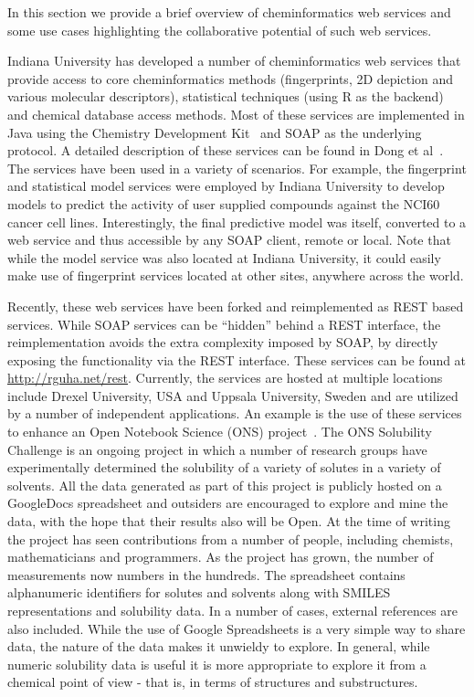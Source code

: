 \documentclass[11pt]{book}
\begin{document}
In this section we provide a brief overview of cheminformatics web
services and some use cases highlighting the collaborative potential
of such web services.

Indiana University has developed a number of cheminformatics web
services\cite{Dong2007Web} that provide access to core cheminformatics methods
(fingerprints, 2D depiction and various molecular descriptors),
statistical techniques (using R\cite{r} as the backend) and chemical
database access methods. Most of these services are implemented in
Java using the Chemistry Development Kit~\cite{Steinbeck2003} and SOAP as the
underlying protocol. A detailed description of these services can be
found in Dong et al~\cite{Dong2007Web}. The services have been used in
a variety of scenarios. For example, the fingerprint and statistical
model services were employed by Indiana University to develop
models to predict the activity of user supplied compounds against the
NCI60 cancer cell lines. Interestingly, the final predictive model was
itself, converted to a web service and thus accessible by any SOAP client,
remote or local. Note that while the model service was also located at
Indiana University, it could easily make use of fingerprint services
located at other sites, anywhere across the world.

Recently, these web services have been forked and reimplemented as
REST based services. While SOAP services can be ``hidden'' behind a
REST interface, the reimplementation avoids the extra complexity
imposed by SOAP, by directly exposing the functionality via the REST
interface. These services can be found at
\url{http://rguha.net/rest}. Currently, the
services are hosted at multiple locations include Drexel University,
USA and Uppsala University, Sweden and are utilized by a number of
independent applications. An example is the use of these services to
enhance an Open Notebook Science (ONS) project~\cite{Bradley2009}. The ONS Solubility
Challenge is an ongoing project in which a number of research groups
have experimentally determined the solubility of a variety of solutes
in a variety of solvents. All the data generated as part of this
project is publicly hosted on a GoogleDocs spreadsheet and outsiders
are encouraged to explore and mine the data, with the hope that their
results also will be Open. At the time of writing the project
has seen contributions from a number of people, including chemists,
mathematicians and programmers. As the project has grown, the number
of measurements now numbers in the hundreds. The spreadsheet contains
alphanumeric identifiers for solutes and solvents along with SMILES
representations and solubility data. In a number of cases, external
references are also included. While the use of Google Spreadsheets is
a very simple way to share data, the nature of the data makes it
unwieldy to explore. In general, while numeric solubility data is
useful it is more appropriate to explore it from a chemical point of
view - that is, in terms of structures and substructures.
\end{document}
